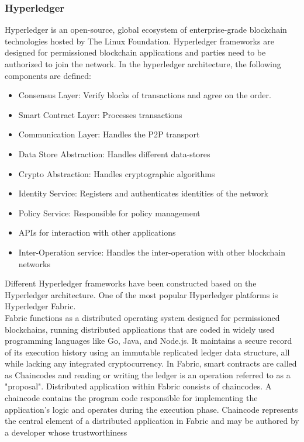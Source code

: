 \subsubsection{Hyperledger}
Hyperledger is an open-source, global ecosystem of enterprise-grade blockchain technologies hosted by The Linux Foundation.
Hyperledger frameworks are designed for permissioned blockchain applications and parties need to be authorized to join the network.
In the hyperledger architecture, the following components are defined:
\begin{itemize}
    \item Consensus Layer: Verify blocks of transactions and agree on the order.
    \item Smart Contract Layer: Processes transactions
    \item Communication Layer: Handles the P2P transport
    \item Data Store Abstraction: Handles different data-stores
    \item Crypto Abstraction: Handles cryptographic algorithms
    \item Identity Service: Registers and authenticates identities of the network
    \item Policy Service: Responsible for policy management
    \item APIs for interaction with other applications
    \item Inter-Operation service: Handles the inter-operation with other blockchain networks
\end{itemize}
Different Hyperledger frameworks have been constructed based on the Hyperledger architecture.
One of the most popular Hyperledger platforms is Hyperledger Fabric.\\
Fabric functions as a distributed operating system designed for permissioned blockchains, running distributed applications that are
coded in widely used programming languages like Go, Java, and Node.js. It maintains a secure record of
its execution history using an immutable replicated ledger data structure, all while lacking any
integrated cryptocurrency. In Fabric, smart contracts are called as Chaincodes and reading or writing the ledger is an operation referred to as a "proposal".
Distributed application within Fabric consists of chaincodes.
A chaincode contains the program code responsible for implementing the application's logic and operates during the execution phase.
Chaincode represents the central element of a distributed application in Fabric and may be authored by a developer whose trustworthiness
